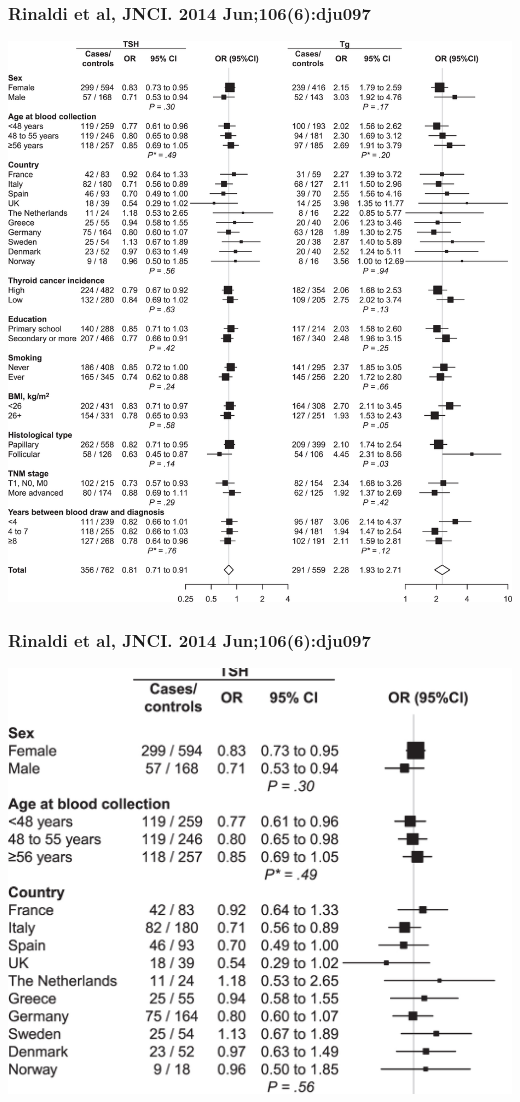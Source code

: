 \documentclass{beamer}
\begin{document}
\begin{frame}
  \frametitle{Rinaldi et al, JNCI. 2014 Jun;106(6):dju097}

  \begin{center}
  \includegraphics[scale=0.09]{figures/thyroid.jpeg}
  \end{center}
  
\end{frame}

\begin{frame}
  \frametitle{Rinaldi et al, JNCI. 2014 Jun;106(6):dju097}

  \begin{center}
  \includegraphics[scale=0.20]{figures/thyroid-zoom.jpeg}
  \end{center}
  
\end{frame}
\end{document}
